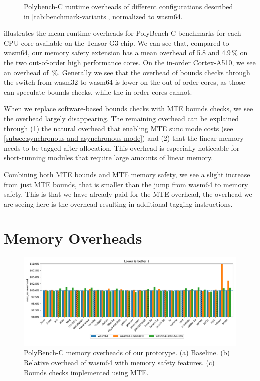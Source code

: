 \begin{figure}[ht]
    \centering
    
    \caption{Polybench-C runtime overheads of different configurations described in \cref{tab:benchmark-variants}, normalized to wasm64.}
    \label{fig:runtime-overheads-combined}
\end{figure}

 illustrates the mean runtime overheads for PolyBench-C benchmarks for each CPU core available on the Tensor G3 chip.
We can see that, compared to wasm64, our memory safety extension has a mean overhead of 5.8 and 4.9\,\% on the two out-of-order high performance cores.
On the in-order Cortex-A510, we see an overhead of \,\%.
Generally we see that the overhead of bounds checks through the switch from wasm32 to wasm64 is lower on the out-of-order cores, as those can speculate bounds checks, while the in-order cores cannot.

When we replace software-based bounds checks with \ac{MTE} bounds checks, we see the overhead largely disappearing.
The remaining overhead can be explained through (1) the natural overhead that enabling \ac{MTE} sunc mode costs (see \cref{subsec:synchronous-and-asynchronous-mode}) and (2) that the linear memory needs to be tagged after allocation.
This overhead is especially noticeable for short-running modules that require large amounts of linear memory.

Combining both \ac{MTE} bounds and \ac{MTE} memory safety, we see a slight increase from just \ac{MTE} bounds, that is smaller than the jump from wasm64 to memory safety.
This is that we have already paid for the \ac{MTE} overhead, the overhead we are seeing here is the overhead resulting in additional tagging instructions.

\section{Memory Overheads}\label{sec:memory-overheads}

\begin{figure}[ht]
    \centering
    \includegraphics[width=\textwidth]{./plots/mem-overhead}
    \caption{{PolyBench-C memory overheads of our prototype. (a) Baseline. (b) Relative overhead of wasm64 with memory safety features. (c) Bounds checks implemented using MTE.}{}}
    \label{fig:memory_overheads}
\end{figure}

